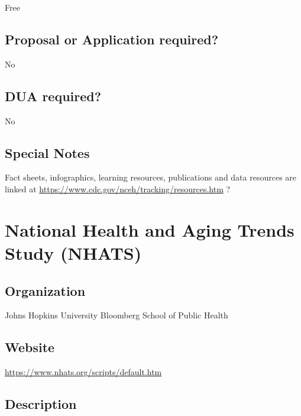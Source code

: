 \documentclass[
]{book}
\begin{document}
Free

\hypertarget{proposal-or-application-required-48}{%
\section{Proposal or Application required?}\label{proposal-or-application-required-48}}

No

\hypertarget{dua-required-48}{%
\section{DUA required?}\label{dua-required-48}}

No

\hypertarget{special-notes-48}{%
\section{Special Notes}\label{special-notes-48}}

Fact sheets, infographics, learning resources, publications and data resources are linked at \url{https://www.cdc.gov/nceh/tracking/resources.htm} ?

\mainmatter

\hypertarget{national-health-and-aging-trends-study-nhats}{%
\chapter{National Health and Aging Trends Study (NHATS)}\label{national-health-and-aging-trends-study-nhats}}

\hypertarget{organization-49}{%
\section{Organization}\label{organization-49}}

Johns Hopkins University Bloomberg School of Public Health

\hypertarget{website-49}{%
\section{Website}\label{website-49}}

\url{https://www.nhats.org/scripts/default.htm}

\hypertarget{description-49}{%
\section{Description}\label{description-49}}
\end{document}
